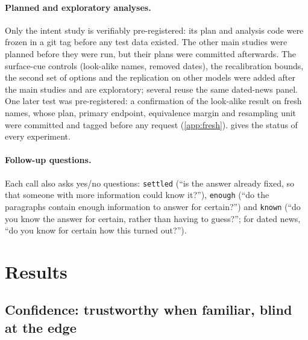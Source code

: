 \documentclass[10pt,twocolumn]{article}
\begin{document}
\paragraph{Planned and exploratory analyses.} Only the intent study is
verifiably pre-registered: its plan and analysis code were frozen in a git
tag before any test data existed. The other main studies were planned before
they were run, but their plans were committed afterwards. The surface-cue
controls (look-alike names, removed dates), the recalibration bounds, the
second set of options and the replication on other models were added after
the main studies and are exploratory; several reuse the same dated-news
panel. One later test was pre-registered: a confirmation of the look-alike
result on fresh names, whose plan, primary endpoint, equivalence margin and
resampling unit were committed and tagged before any request
(\cref{app:fresh}).  gives the status of every experiment.


\paragraph{Follow-up questions.} Each call also asks yes/no questions:
\texttt{settled} (``is the answer already fixed, so that someone with more
information could know it?''), \texttt{enough} (``do the paragraphs contain
enough information to answer for certain?'') and \texttt{known} (``do you know
the answer for certain, rather than having to guess?''; for dated news, ``do
you know for certain how this turned out?'').


\section{Results}
\label{sec:results}

\subsection{Confidence: trustworthy when familiar, blind at the edge}
\label{sec:answer}
\end{document}
